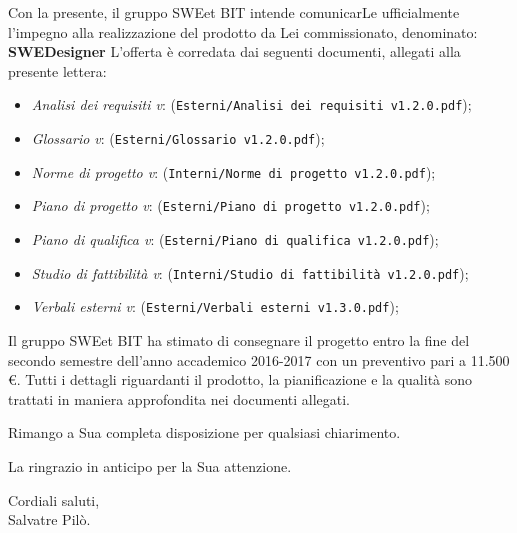 \vspace{5mm}Con la presente, il gruppo SWEet BIT intende comunicarLe ufficialmente l'impegno
	alla realizzazione del prodotto da Lei commissionato, denominato: {\textbf{SWEDesigner}} \newline
	L'offerta è corredata dai seguenti documenti, allegati alla presente lettera:
	\begin{itemize}
		\item \emph{Analisi dei requisiti v\VersioneAR{}}: (\verb|Esterni/Analisi dei requisiti v1.2.0.pdf|);
		\item \emph{Glossario v\VersioneG{}}: (\verb|Esterni/Glossario v1.2.0.pdf|);
		\item \emph{Norme di progetto v\VersioneNP{}}: (\verb|Interni/Norme di progetto v1.2.0.pdf|);
		\item \emph{Piano di progetto v\VersionePP{}}: (\verb|Esterni/Piano di progetto v1.2.0.pdf|);
		\item \emph{Piano di qualifica v\VersionePQ{}}: (\verb|Esterni/Piano di qualifica v1.2.0.pdf|);
		\item \emph{Studio di fattibilità v\VersioneSF{}}: (\verb|Interni/Studio di fattibilità v1.2.0.pdf|);
		\item \emph{Verbali esterni v\VersioneVE{}}: (\verb|Esterni/Verbali esterni v1.3.0.pdf|);
	\end{itemize}
	Il gruppo SWEet BIT ha stimato di consegnare il progetto entro la fine del secondo semestre dell'anno accademico 2016-2017
	con un preventivo pari a 11.500 \euro .
	Tutti i dettagli riguardanti il prodotto, la pianificazione e la qualità sono trattati in maniera approfondita
	nei documenti allegati.
	\begin{flushleft}
	\vspace{2cm}
		Rimango a Sua completa disposizione per qualsiasi chiarimento.
	\end{flushleft}
	\begin{flushleft}
		La ringrazio in anticipo per la Sua attenzione.
	\end{flushleft}
	\vspace{5mm}
	\begin{center}
		Cordiali saluti,\\
		\vspace{1cm}Salvatre Pilò.
	\end{center}
